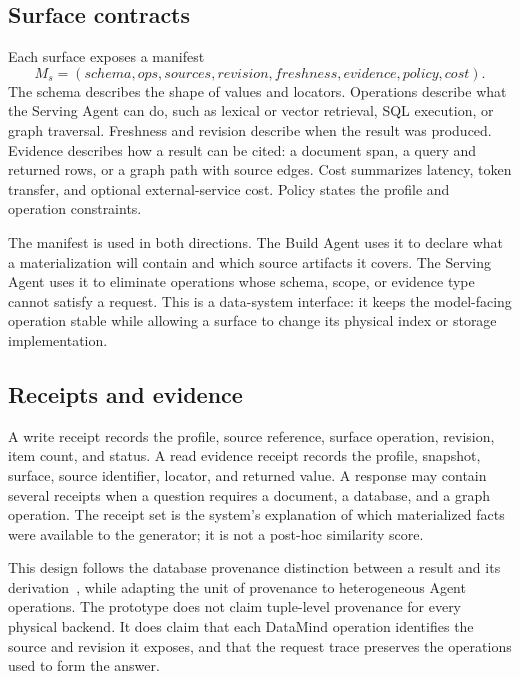 \subsection{Surface contracts}
\label{sec:surface-contract}

Each surface exposes a manifest
\[
 M_s=(\mathit{schema},\mathit{ops},\mathit{sources},\mathit{revision},
 \mathit{freshness},\mathit{evidence},\mathit{policy},\mathit{cost}).
\]
The schema describes the shape of values and locators. Operations describe
what the Serving Agent can do, such as lexical or vector retrieval, SQL
execution, or graph traversal. Freshness and revision describe when the result
was produced. Evidence describes how a result can be cited: a document span, a
query and returned rows, or a graph path with source edges. Cost summarizes
latency, token transfer, and optional external-service cost. Policy states the
profile and operation constraints.

The manifest is used in both directions. The Build Agent uses it to declare
what a materialization will contain and which source artifacts it covers. The
Serving Agent uses it to eliminate operations whose schema, scope, or evidence
type cannot satisfy a request. This is a data-system interface: it keeps the
model-facing operation stable while allowing a surface to change its physical
index or storage implementation.

\subsection{Receipts and evidence}
\label{sec:receipts}

A write receipt records the profile, source reference, surface operation,
revision, item count, and status. A read evidence receipt records the profile,
snapshot, surface, source identifier, locator, and returned value. A response
may contain several receipts when a question requires a document, a database,
and a graph operation. The receipt set is the system's explanation of which
materialized facts were available to the generator; it is not a post-hoc
similarity score.

This design follows the database provenance distinction between a result and
its derivation~\cite{cheney2009provenance,green2007provenance}, while adapting
the unit of provenance to heterogeneous Agent operations. The prototype does
not claim tuple-level provenance for every physical backend. It does claim
that each DataMind operation identifies the source and revision it exposes,
and that the request trace preserves the operations used to form the answer.


